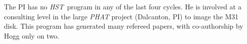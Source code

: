 \documentclass[12pt]{article}
\newcommand{\project}[1]{\textsl{#1}}
\newcommand{\HST}{\project{HST}}
\begin{document}
The PI has no \HST\ program in any of the last four cycles.  He is
involved at a consulting level in the large \project{PHAT} project
(Dalcanton, PI) to image the M31 disk.  This program has generated
many refereed papers, with co-authorship by Hogg only on two.

%
%




\end{document}
